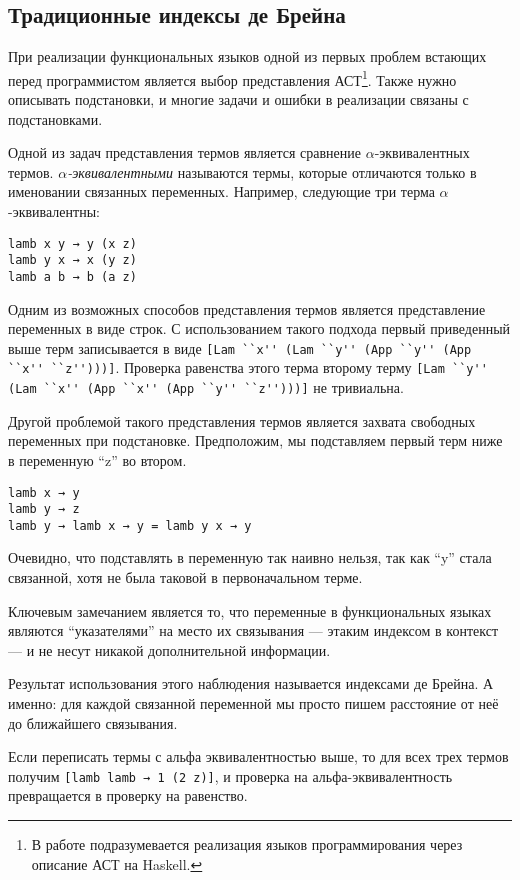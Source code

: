\subsection{Традиционные индексы де Брейна}\label{de_brujin}
При реализации функциональных языков одной из первых проблем встающих перед программистом является выбор представления АСТ\footnote{В работе подразумевается реализация языков программирования через описание АСТ на Haskell.}. Также нужно описывать подстановки, и многие задачи и ошибки в реализации связаны с подстановками.

Одной из задач представления термов является сравнение $\alpha$-эквивалентных термов. \textit{$\alpha$-эквивалентными} называются термы, которые отличаются только в именовании связанных переменных. Например, следующие три терма $\alpha$-эквивалентны:

\begin{lstlisting}
lamb x y → y (x z)
lamb y x → x (y z)
lamb a b → b (a z)
\end{lstlisting}

Одним из возможных способов представления термов является представление переменных в виде строк. С использованием такого подхода первый приведенный выше терм записывается в виде \lstinline{[Lam ``x'' (Lam ``y'' (App ``y'' (App ``x'' ``z'')))]}. Проверка равенства этого терма второму терму \lstinline{[Lam ``y'' (Lam ``x'' (App ``x'' (App ``y'' ``z'')))]} не тривиальна.

Другой проблемой такого представления термов является захвата свободных переменных при подстановке. Предположим, мы подставляем первый терм ниже в переменную ``z'' во втором.
\begin{lstlisting}
lamb x → y
lamb y → z
lamb y → lamb x → y = lamb y x → y
\end{lstlisting}

Очевидно, что подставлять в переменную так наивно нельзя, так как ``y'' стала связанной, хотя не была таковой в первоначальном терме.

Ключевым замечанием является то, что переменные в функциональных языках являются ``указателями'' на место их связывания --- этаким индексом в контекст --- и не несут никакой дополнительной информации.

Результат использования этого наблюдения называется индексами де Брейна. А именно: для каждой связанной переменной мы просто пишем расстояние от неё до ближайшего связывания.

Если переписать термы с альфа эквивалентностью выше, то для всех трех термов получим \lstinline{[lamb lamb → 1 (2 z)]}, и проверка на альфа-эквивалентность превращается в проверку на равенство.

